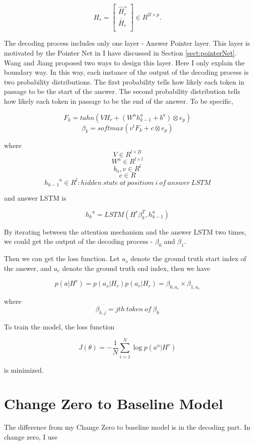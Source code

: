 \documentclass[modernstyle,12pt]{sjsuthesis}
\theoremstyle{definition}
\begin{document}
\[ H_r =
\begin{bmatrix}
\overrightarrow{H_r} \\
\overleftarrow{H_r} \\
\end{bmatrix}
\in R^{2l \times p}.
\]

The decoding process includes only one layer - Answer Pointer layer. This layer is motivated by the Pointer Net in \cite{vinyals2015pointer} I have discussed in Section \ref{sect:pointerNet}. Wang and Jiang proposed two ways to design this layer. Here I only explain the boundary way. In this way, each instance of the output of the decoding process is two probability distributions. The first probability tells how likely each token in passage to be the start of the answer. The second probability distribution tells how likely each token in passage to be the end of the answer. To be specific,

$$F_k = tahn(VH_r + (W^a{h^a_{k-1}} +  b^a) \otimes e_p)$$
$$\beta _k = softmax(v^tF_k + c \otimes e_p)$$


where
$$V \in R^{l \times 2l}$$
$$W^a\in R^{l \times l} $$
$$b_a, v\in R^{l}  $$
$$c \in R $$
$${h_{k-1}}^a\in R^{l}: hidden\ state\ at\ positiom\ i\ of\ answer\ LSTM  $$

and answer LSTM is


$${h_k}^a = LSTM(H^r\beta _k^T, h_{k-1}^a)$$

By iterating between the attention mechanism and the answer LSTM two times, we could get the output of the decoding process - $\beta _0$ and $\beta _1$.


Then we can get the loss function. Let $a_s$ denote the ground truth start index of the answer, and $a_e$ denote the ground truth end index, then we have

$$p(a|H^r) = p(a_s|H_r)p(a_r|H_r)=\beta _{0, a_s} \times \beta_{1, a_e}$$

where $$\beta_{k, j} = jth\ token\ of\ \beta _k$$

To train the model, the loss function

$$J(\theta) = -\frac{1}{N}\sum_{i=1}^{N} \log{p(a^n|H^r)} $$

is minimized.

\section{Change Zero to Baseline Model} \label{sect:change_0}

The difference from my Change Zero to baseline model is in the decoding part. In change zero, I use
\end{document}
